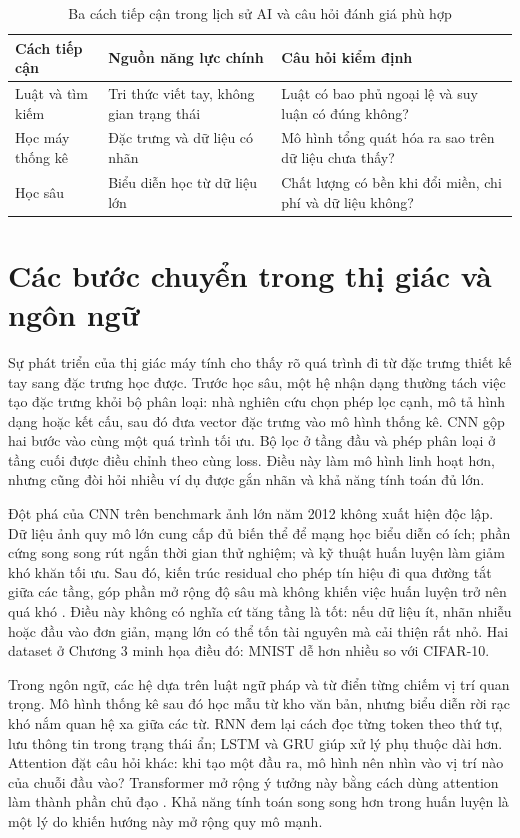 \documentclass[12pt,a4paper]{report}
\begin{document}
\begin{table}[htbp]\centering\caption{Ba cách tiếp cận trong lịch sử AI và câu hỏi đánh giá phù hợp}\label{tab:history-paradigms}
\begin{tabularx}{\textwidth}{p{2.4cm}p{3.3cm}X}
\toprule\textbf{Cách tiếp cận} & \textbf{Nguồn năng lực chính} & \textbf{Câu hỏi kiểm định} \\\midrule
Luật và tìm kiếm & Tri thức viết tay, không gian trạng thái & Luật có bao phủ ngoại lệ và suy luận có đúng không?\\
Học máy thống kê & Đặc trưng và dữ liệu có nhãn & Mô hình tổng quát hóa ra sao trên dữ liệu chưa thấy?\\
Học sâu & Biểu diễn học từ dữ liệu lớn & Chất lượng có bền khi đổi miền, chi phí và dữ liệu không?\\
\bottomrule\end{tabularx}\end{table}

\section{Các bước chuyển trong thị giác và ngôn ngữ}
Sự phát triển của thị giác máy tính cho thấy rõ quá trình đi từ đặc trưng thiết kế tay sang đặc trưng học được. Trước học sâu, một hệ nhận dạng thường tách việc tạo đặc trưng khỏi bộ phân loại: nhà nghiên cứu chọn phép lọc cạnh, mô tả hình dạng hoặc kết cấu, sau đó đưa vector đặc trưng vào mô hình thống kê. CNN gộp hai bước vào cùng một quá trình tối ưu. Bộ lọc ở tầng đầu và phép phân loại ở tầng cuối được điều chỉnh theo cùng loss. Điều này làm mô hình linh hoạt hơn, nhưng cũng đòi hỏi nhiều ví dụ được gắn nhãn và khả năng tính toán đủ lớn.

Đột phá của CNN trên benchmark ảnh lớn năm 2012 không xuất hiện độc lập. Dữ liệu ảnh quy mô lớn cung cấp đủ biến thể để mạng học biểu diễn có ích; phần cứng song song rút ngắn thời gian thử nghiệm; và kỹ thuật huấn luyện làm giảm khó khăn tối ưu. Sau đó, kiến trúc residual cho phép tín hiệu đi qua đường tắt giữa các tầng, góp phần mở rộng độ sâu mà không khiến việc huấn luyện trở nên quá khó \cite{resnet2016}. Điều này không có nghĩa cứ tăng tầng là tốt: nếu dữ liệu ít, nhãn nhiễu hoặc đầu vào đơn giản, mạng lớn có thể tốn tài nguyên mà cải thiện rất nhỏ. Hai dataset ở Chương 3 minh họa điều đó: MNIST dễ hơn nhiều so với CIFAR-10.

Trong ngôn ngữ, các hệ dựa trên luật ngữ pháp và từ điển từng chiếm vị trí quan trọng. Mô hình thống kê sau đó học mẫu từ kho văn bản, nhưng biểu diễn rời rạc khó nắm quan hệ xa giữa các từ. RNN đem lại cách đọc từng token theo thứ tự, lưu thông tin trong trạng thái ẩn; LSTM và GRU giúp xử lý phụ thuộc dài hơn. Attention đặt câu hỏi khác: khi tạo một đầu ra, mô hình nên nhìn vào vị trí nào của chuỗi đầu vào? Transformer mở rộng ý tưởng này bằng cách dùng attention làm thành phần chủ đạo \cite{transformer2017}. Khả năng tính toán song song hơn trong huấn luyện là một lý do khiến hướng này mở rộng quy mô mạnh.
\end{document}
